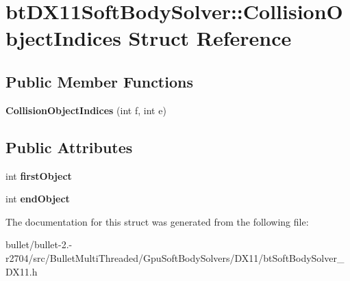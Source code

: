 \hypertarget{structbt_d_x11_soft_body_solver_1_1_collision_object_indices}{\section{bt\+D\+X11\+Soft\+Body\+Solver\+:\+:Collision\+Object\+Indices Struct Reference}
\label{structbt_d_x11_soft_body_solver_1_1_collision_object_indices}
}
\subsection*{Public Member Functions}
\begin{DoxyCompactItemize}
\item 
\hypertarget{structbt_d_x11_soft_body_solver_1_1_collision_object_indices_adaf8bf80b9756917abf96ee553af9058}{{\bfseries Collision\+Object\+Indices} (int f, int e)}\label{structbt_d_x11_soft_body_solver_1_1_collision_object_indices_adaf8bf80b9756917abf96ee553af9058}

\end{DoxyCompactItemize}
\subsection*{Public Attributes}
\begin{DoxyCompactItemize}
\item 
\hypertarget{structbt_d_x11_soft_body_solver_1_1_collision_object_indices_a732fc974741e904d2b43457df7712403}{int {\bfseries first\+Object}}\label{structbt_d_x11_soft_body_solver_1_1_collision_object_indices_a732fc974741e904d2b43457df7712403}

\item 
\hypertarget{structbt_d_x11_soft_body_solver_1_1_collision_object_indices_a1341ec63032abdabca34fff029606454}{int {\bfseries end\+Object}}\label{structbt_d_x11_soft_body_solver_1_1_collision_object_indices_a1341ec63032abdabca34fff029606454}

\end{DoxyCompactItemize}


The documentation for this struct was generated from the following file\+:\begin{DoxyCompactItemize}
\item 
bullet/bullet-\/2.-\/r2704/src/\+Bullet\+Multi\+Threaded/\+Gpu\+Soft\+Body\+Solvers/\+D\+X11/bt\+Soft\+Body\+Solver\+\_\+\+D\+X11.\+h\end{DoxyCompactItemize}
